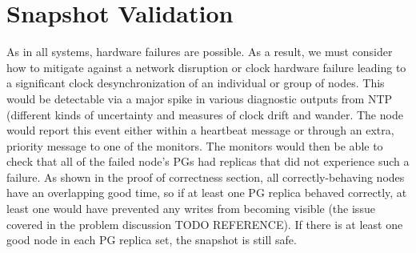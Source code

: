 \section{Snapshot Validation}

As in all systems, hardware failures are possible. As a result, we
must consider how to mitigate against a network disruption or clock
hardware failure leading to a significant clock desynchronization of
an individual or group of nodes. This would be detectable via a major
spike in various diagnostic outputs from NTP (different kinds of
uncertainty and measures of clock drift and wander. %
The node would report this event either within a heartbeat message or
through an extra, priority message to one of the monitors. The
monitors would then be able to check that all of the failed node’s PGs
had replicas that did not experience such a failure. As shown in the
proof of correctness section, all correctly-behaving nodes have an
overlapping good time, so if at least one PG replica behaved
correctly, at least one would have prevented any writes from becoming
visible (the issue covered in the problem discussion TODO
REFERENCE). If there is at least one good node in each PG replica set,
the snapshot is still safe.


